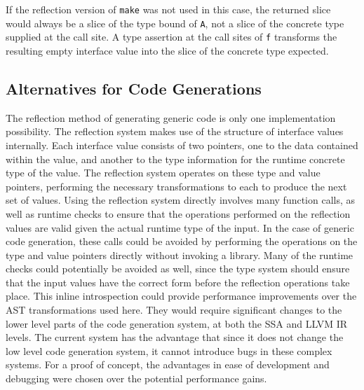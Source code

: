 \documentclass[letterpaper,11pt]{article}
\begin{document}
If the reflection version of \texttt{make} was not used in this case, the returned slice would always be a slice of the type bound of \texttt{A}, not a slice of the concrete type supplied at the call site. A type assertion at the call sites of \texttt{f} transforms the resulting empty interface value into the slice of the concrete type expected.

\subsection{Alternatives for Code Generations} \label{codegenalt}

The reflection method of generating generic code is only one implementation possibility. The reflection system makes use of the structure of interface values internally. Each interface value consists of two pointers, one to the data contained within the value, and another to the type information for the runtime concrete type of the value. The reflection system operates on these type and value pointers, performing the necessary transformations to each to produce the next set of values. Using the reflection system directly involves many function calls, as well as runtime checks to ensure that the operations performed on the reflection values are valid given the actual runtime type of the input. In the case of generic code generation, these calls could be avoided by performing the operations on the type and value pointers directly without invoking a library. Many of the runtime checks could potentially be avoided as well, since the type system should ensure that the input values have the correct form before the reflection operations take place. This inline introspection could provide performance improvements over the AST transformations used here. They would require significant changes to the lower level parts of the code generation system, at both the SSA and LLVM IR levels. The current system has the advantage that since it does not change the low level code generation system, it cannot introduce bugs in these complex systems. For a proof of concept, the advantages in ease of development and debugging were chosen over the potential performance gains.
\end{document}
